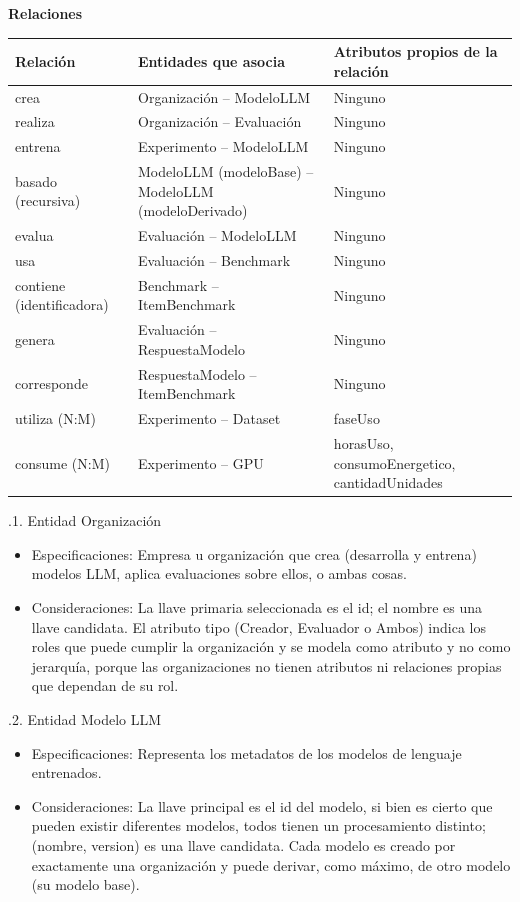 \documentclass[12pt,a4paper]{article}
\begin{document}
\textbf{Relaciones}

\begingroup
\fontsize{11}{14}\selectfont
\begin{longtable}{|>{\raggedright\arraybackslash}p{2.5cm}|>{\raggedright\arraybackslash}p{5.0cm}|>{\raggedright\arraybackslash}p{6.8cm}|}
\hline
\textbf{Relación} & \textbf{Entidades que asocia} & \textbf{Atributos propios de la relación} \\
\hline
\endhead
crea & Organización -- ModeloLLM & Ninguno \\
\hline
realiza & Organización -- Evaluación & Ninguno \\
\hline
entrena & Experimento -- ModeloLLM & Ninguno \\
\hline
basado (recursiva) & ModeloLLM (modeloBase) -- ModeloLLM (modeloDerivado) & Ninguno \\
\hline
evalua & Evaluación -- ModeloLLM & Ninguno \\
\hline
usa & Evaluación -- Benchmark & Ninguno \\
\hline
contiene (identificadora) & Benchmark -- ItemBenchmark & Ninguno \\
\hline
genera & Evaluación -- RespuestaModelo & Ninguno \\
\hline
corresponde & RespuestaModelo -- ItemBenchmark & Ninguno \\
\hline
utiliza (N:M) & Experimento -- Dataset & faseUso \\
\hline
consume (N:M) & Experimento -- GPU & horasUso, consumoEnergetico, cantidadUnidades \\
\hline
\end{longtable}
\endgroup

.1. Entidad Organización
{\begin{itemize}
  \item Especificaciones: Empresa u organización que crea (desarrolla y entrena) modelos LLM, aplica evaluaciones sobre ellos, o ambas cosas.
  \item Consideraciones: La llave primaria seleccionada es el id; el nombre es una llave candidata. El atributo tipo (Creador, Evaluador o Ambos) indica los roles que puede cumplir la organización y se modela como atributo y no como jerarquía, porque las organizaciones no tienen atributos ni relaciones propias que dependan de su rol.
\end{itemize}
}

.2. Entidad Modelo LLM
{\begin{itemize}
  \item Especificaciones: Representa los metadatos de los modelos de lenguaje entrenados.
  \item Consideraciones: La llave principal es el id del modelo, si bien es cierto que pueden existir diferentes modelos, todos tienen un procesamiento distinto; (nombre, version) es una llave candidata. Cada modelo es creado por exactamente una organización y puede derivar, como máximo, de otro modelo (su modelo base).
\end{itemize}
}
\end{document}
